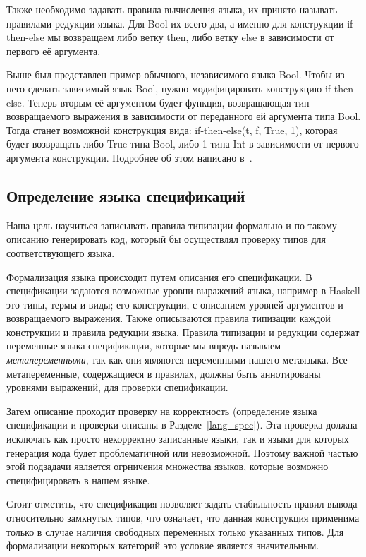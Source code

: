 Также необходимо задавать правила вычисления языка, их принято называть правилами редукции языка. Для Bool их всего два, а именно для конструкции if-then-else мы возвращаем либо ветку then, либо ветку else в зависимости от первого её аргумента.

Выше был представлен пример обычного, независимого языка Bool. Чтобы из него сделать зависимый язык Bool, нужно модифицировать конструкцию if-then-else. Теперь вторым её аргументом будет функция, возвращающая тип возвращаемого выражения в зависимости от переданного ей аргумента типа Bool. Тогда станет возможной конструкция вида: if-then-else(t, f, True, 1), которая будет возвращать либо True типа Bool, либо 1 типа Int в зависимости от первого аргумента конструкции. Подробнее об этом написано в~\cite{martin_lof}.

\subsection*{Определение языка спецификаций}

Наша цель научиться записывать правила типизации формально и по такому описанию генерировать код, который бы осуществлял проверку типов для соответствующего языка.

Формализация языка происходит путем описания его спецификации. В спецификации задаются возможные уровни выражений языка, например в Haskell это типы, термы и виды; его конструкции, с описанием уровней аргументов и возвращаемого выражения. Также описываются правила типизации каждой конструкции и правила редукции языка. Правила типизации и редукции содержат переменные языка спецификации, которые мы впредь называем \textit{метапеременными}, так как они являются переменными нашего метаязыка. Все метапеременные, содержащиеся в правилах, должны быть аннотированы уровнями выражений, для проверки спецификации.

Затем описание проходит проверку на корректность (определение языка спецификации и проверки описаны в Разделе~\ref{lang_spec}). Эта проверка должна исключать как просто некорректно записанные языки, так и языки для которых генерация кода будет проблематичной или невозможной. Поэтому важной частью этой подзадачи является огрничения множества языков, которые возможно специфицировать в нашем языке.

Стоит отметить, что спецификация позволяет задать стабильность правил вывода относительно замкнутых типов, что означает, что данная конструкция применима только в случае наличия свободных переменных только указанных типов. Для формализации некоторых категорий\cite{ncat:inf} это условие является значительным.

